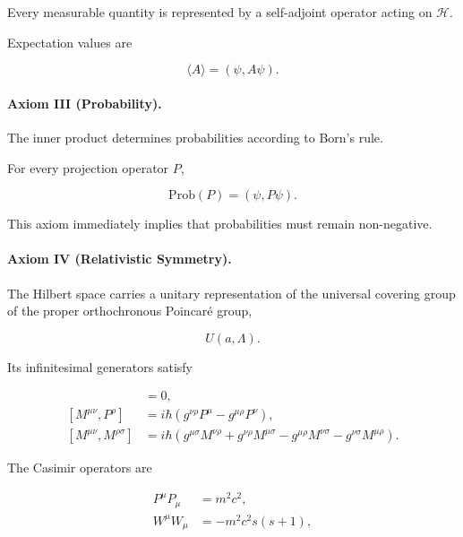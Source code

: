 Every measurable quantity is represented by a self-adjoint operator acting on
$\mathcal H$.

Expectation values are

\begin{equation}
\langle A\rangle
=
(\psi,A\psi).
\end{equation}

\paragraph{Axiom III (Probability).}

The inner product determines probabilities according to Born's rule.

For every projection operator $P$,

\begin{equation}
\mathrm{Prob}(P)
=
(\psi,P\psi).
\end{equation}

This axiom immediately implies that probabilities must remain non-negative.


\paragraph{Axiom IV (Relativistic Symmetry).}

The Hilbert space carries a unitary representation of the universal covering
group of the proper orthochronous Poincaré group,

\begin{equation}
U(a,\Lambda).
\end{equation}

Its infinitesimal generators satisfy

\begin{align}
[P^\mu,P^\nu]
&=0,
\\
[M^{\mu\nu},P^\rho]
&=
i\hbar
(g^{\nu\rho}P^\mu-g^{\mu\rho}P^\nu),
\\
[M^{\mu\nu},M^{\rho\sigma}]
&=
i\hbar
(
g^{\mu\sigma}M^{\nu\rho}
+
g^{\nu\rho}M^{\mu\sigma}
-
g^{\mu\rho}M^{\nu\sigma}
-
g^{\nu\sigma}M^{\mu\rho}
).
\end{align}

The Casimir operators are

\begin{align}
P^\mu P_\mu &=m^2c^2,
\\
W^\mu W_\mu
&=
-m^2c^2s(s+1),
\end{align}

